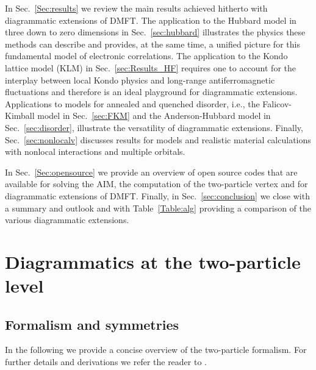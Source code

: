 \documentclass[rmp,aps,reprint,amsmath,amssymb,superscriptaddress,showpacs,nofootinbib]{revtex4-1}
\begin{document}
In Sec.~\ref{Sec:results} we review the main results achieved hitherto with diagrammatic extensions of DMFT. The application to the Hubbard model in three down to zero dimensions in Sec.~\ref{sec:hubbard} illustrates the physics these methods can describe and provides, at the same time, a unified picture for this fundamental model of electronic correlations. The application to the Kondo lattice model (KLM) in Sec.~\ref{sec:Results_HF} requires one to account for the interplay between local Kondo physics and long-range antiferromagnetic fluctuations and therefore is an ideal playground for diagrammatic extensions. Applications to models for annealed and quenched disorder, i.e., the Falicov-Kimball model in Sec.~\ref{sec:FKM} and the Anderson-Hubbard model in Sec.~\ref{sec:disorder}, illustrate the versatility of diagrammatic extensions. Finally, Sec.~\ref{sec:nonlocalv} discusses results for models and realistic material  calculations with nonlocal interactions and multiple orbitals.

In Sec.~\ref{Sec:opensource} we provide an overview of open source codes that are available for solving the  AIM, the computation of the two-particle vertex and for diagrammatic extensions of DMFT.
Finally, in Sec.~\ref{sec:conclusion} we close with a summary and outlook and with Table~\ref{Table:alg} providing a comparison of the various diagrammatic extensions.



\section{Diagrammatics at the two-particle level}
\label{sec:vertex}

\subsection{Formalism and symmetries}
\label{sec:formalism}

In the following we provide a concise overview of the two-particle formalism. For further details and derivations we refer the reader to  .
\end{document}
